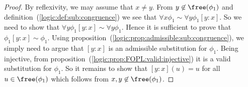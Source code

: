\noindent
\begin{proof}
By reflexivity, we may assume that $x\neq y$. From $y\not\in\free(\phi_{1})$ and
definition~(\ref{logic:def:sub:congruence}) we see that $\forall
x\phi_{1}\sim\forall y\phi_{1}[y\!:\!x]$. So we need to show that
$\forall y\phi_{1}[y\!:\!x]\sim\forall y\phi_{1}$. Hence it is
sufficient to prove that $\phi_{1}[y\!:\!x]\sim\phi_{1}$. Using
proposition~(\ref{logic:prop:admissible:sub:congruence}), we simply
need to argue that $[y\!:\!x]$ is an admissible substitution for
$\phi_{1}$. Being injective, from
proposition~(\ref{logic:prop:FOPL:valid:injective}) it is a valid
substitution for $\phi_{1}$. So it remains to show that
$[y\!:\!x](u)=u$ for all $u\in\free(\phi_{1})$ which follows
from $x,y\not\in\free(\phi_{1})$.
\end{proof}
